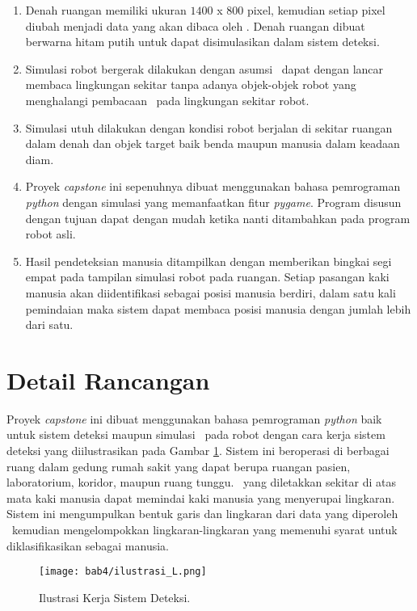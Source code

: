 \begin{enumerate}
    \item Denah ruangan memiliki ukuran $1400$ x $800$ pixel, kemudian setiap pixel diubah menjadi data yang akan dibaca oleh \lidar. Denah ruangan dibuat berwarna hitam putih untuk dapat disimulasikan dalam sistem deteksi.  
    \item Simulasi robot bergerak dilakukan dengan asumsi \lidar\ dapat dengan lancar membaca lingkungan sekitar tanpa adanya objek-objek robot yang menghalangi pembacaan \lidar\ pada lingkungan sekitar robot.  
    \item Simulasi utuh dilakukan dengan kondisi robot berjalan di sekitar ruangan dalam denah dan objek target baik benda maupun manusia dalam keadaan diam.  
    \item Proyek \textit{capstone} ini sepenuhnya dibuat menggunakan bahasa pemrograman \textit{python} dengan simulasi yang memanfaatkan fitur \textit{pygame}. Program disusun dengan tujuan dapat dengan mudah ketika nanti ditambahkan pada program robot asli.
    \item Hasil pendeteksian manusia ditampilkan dengan memberikan bingkai  segi empat pada tampilan simulasi robot pada ruangan. Setiap pasangan kaki manusia akan diidentifikasi sebagai posisi manusia berdiri, dalam satu kali pemindaian maka sistem dapat membaca posisi manusia dengan jumlah lebih dari satu.
\end{enumerate}



\section{Detail Rancangan}
\label{sec:Detail_Rancangan}

Proyek \textit{capstone} ini dibuat menggunakan bahasa pemrograman \textit{python} baik untuk sistem deteksi maupun simulasi \lidar\ pada robot dengan cara kerja sistem deteksi yang diilustrasikan pada Gambar \ref{fig:Ch04_ilustrasi}. Sistem ini beroperasi di berbagai ruang dalam gedung rumah sakit yang dapat berupa ruangan pasien, laboratorium, koridor, maupun ruang tunggu. \lidar\ yang diletakkan sekitar di atas mata kaki manusia dapat memindai kaki manusia yang menyerupai lingkaran. Sistem ini mengumpulkan bentuk garis dan lingkaran dari data yang diperoleh \lidar\ kemudian mengelompokkan lingkaran-lingkaran yang memenuhi syarat untuk diklasifikasikan sebagai manusia.

\begin{figure}[H]
    \centering
    \texttt{[image: bab4/ilustrasi\_L.png]}
    \caption{Ilustrasi Kerja Sistem Deteksi.} 
    \label{fig:Ch04_ilustrasi}
\end{figure}

